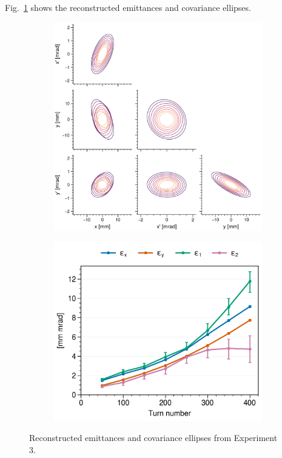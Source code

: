 Fig.~\ref{fig:exp3_emittances} shows the reconstructed emittances and covariance ellipses.
%
\begin{figure}[!p]
    \centering
    \begin{subfigure}{0.6\textwidth}
        \includegraphics[width=\textwidth]{Images/chapter5/exp3/corner.png}
    \end{subfigure}
    \hfill
    \begin{subfigure}[t]{0.39\textwidth}
        \includegraphics[width=\textwidth]{Images/chapter5/exp3/emittances.png}
    \end{subfigure}
    \caption{Reconstructed emittances and covariance ellipses from Experiment 3.}
    \label{fig:exp3_emittances}
\end{figure}
